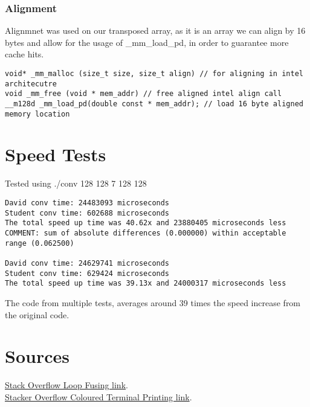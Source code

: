 \documentclass[12pt,fleqn,leqno,letterpaper]{article}
\begin{document}
\subsubsection{Alignment}
Alignmnet was used on our transposed array, as it is an array we can align by 16 bytes and allow
for the usage of \_mm\_load\_pd, in order to guarantee more cache hits.

\begin{verbatim}
void* _mm_malloc (size_t size, size_t align) // for aligning in intel architecutre
void _mm_free (void * mem_addr) // free aligned intel align call
__m128d _mm_load_pd(double const * mem_addr); // load 16 byte aligned memory location
\end{verbatim}

\section{Speed Tests}
Tested using ./conv 128 128 7 128 128 
\begin{verbatim}
David conv time: 24483093 microseconds
Student conv time: 602688 microseconds
The total speed up time was 40.62x and 23880405 microseconds less
COMMENT: sum of absolute differences (0.000000) within acceptable range (0.062500)

David conv time: 24629741 microseconds
Student conv time: 629424 microseconds
The total speed up time was 39.13x and 24000317 microseconds less
\end{verbatim}
The code from multiple tests, averages around 39 times the speed increase from the original
code.

\section{Sources}
\href{https://stackoverflow.com/questions/18749493/openmp-drastically-slows-down-for-loop/18763554#18763554}{Stack Overflow Loop Fusing link}. \\
\href{https://stackoverflow.com/questions/3219393/stdlib-and-colored-output-in-c}{Stacker Overflow Coloured Terminal Printing link}.
%
\end{document}
